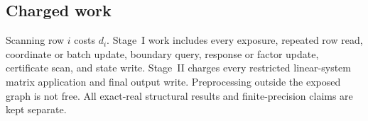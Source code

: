 \subsection{Charged work}

Scanning row $i$ costs $d_i$.  Stage~I work includes every exposure, repeated
row read, coordinate or batch update, boundary query, response or factor
update, certificate scan, and state write.  Stage~II charges every restricted
linear-system matrix application and final output write.  Preprocessing
outside the exposed graph is not free.  All exact-real structural results and finite-precision
claims are kept separate.
